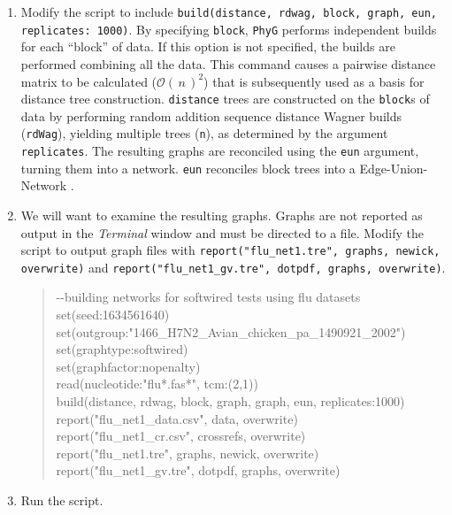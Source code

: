 \documentclass[11pt]{article}
\newcommand{\phyg}{\texttt{PhyG} }
\newcommand{\BigO}[1]{\ensuremath{\mathcal{O}\left(\,#1\,\right)}\xspace}
\begin{document}
\begin{enumerate}

\item Modify the script to include \texttt{build(distance, rdwag, block, graph, eun, 
replicates: 1000)}. By specifying \texttt{block}, \phyg performs independent builds 
for each ``block'' of data. If this option is not specified, the builds are performed 
combining all the data. This command causes a pairwise distance matrix to be 
calculated ($\BigO n^2$) that is subsequently used as a basis for distance tree 
construction. \texttt{distance} trees are constructed on the \texttt{block}s of data 
by performing random addition sequence distance Wagner builds (\texttt{rdWag}), 
yielding multiple trees (\texttt{n}), as determined by the argument \texttt{replicates}. 
The resulting graphs are reconciled using the \texttt{eun} argument, turning them 
into a network. \texttt{eun} reconciles block trees into a Edge-Union-Network 
\citep{MiyagiandWheeler2019, Wheeler2022}.

\item We will want to examine the resulting graphs. Graphs are not reported as 
output in the \textit{Terminal} window and must be directed to a file. Modify the 
script to output graph files with \texttt{report("flu\_net1.tre", graphs, newick, 
overwrite)} and \texttt{report("flu\_net1\_gv.tre", dotpdf, graphs, overwrite)}.

	\begin{quote}	
	-\/-building networks for softwired tests using flu datasets\\
	set(seed:1634561640)\\
	set(outgroup:"1466\_H7N2\_Avian\_chicken\_pa\_1490921\_2002")\\
	set(graphtype:softwired)\\
	set(graphfactor:nopenalty)\\ 
	read(nucleotide:"flu*.fas*", tcm:(2,1))\\
	build(distance, rdwag, block, graph, graph, eun, replicates:1000)\\
	report("flu\_net1\_data.csv", data, overwrite)\\
	report("flu\_net1\_cr.csv", crossrefs, overwrite)\\
	report("flu\_net1.tre", graphs, newick, overwrite)\\
	report("flu\_net1\_gv.tre", dotpdf, graphs, overwrite)
	\end{quote}
	
\item Run the script.


\end{enumerate}
\end{document}

